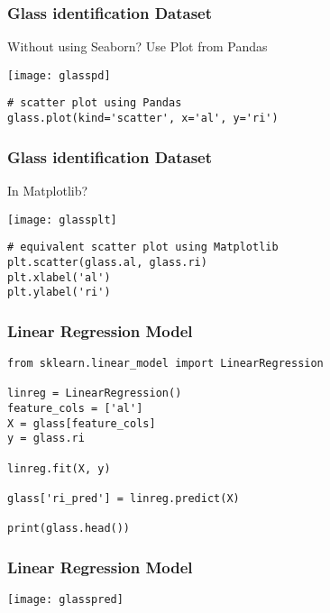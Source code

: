 \begin{frame}[fragile]\frametitle{Glass identification Dataset}
Without using Seaborn? Use Plot from Pandas

\begin{center}
\texttt{[image: glasspd]}
\end{center}

\begin{lstlisting}
# scatter plot using Pandas
glass.plot(kind='scatter', x='al', y='ri')
\end{lstlisting}

\end{frame}

\begin{frame}[fragile]\frametitle{Glass identification Dataset}
In Matplotlib?

\begin{center}
\texttt{[image: glassplt]}
\end{center}

\begin{lstlisting}
# equivalent scatter plot using Matplotlib
plt.scatter(glass.al, glass.ri)
plt.xlabel('al')
plt.ylabel('ri')
\end{lstlisting}

\end{frame}



\begin{frame}[fragile]\frametitle{Linear Regression Model}
\begin{lstlisting}
from sklearn.linear_model import LinearRegression

linreg = LinearRegression()
feature_cols = ['al']
X = glass[feature_cols]
y = glass.ri

linreg.fit(X, y)

glass['ri_pred'] = linreg.predict(X)

print(glass.head())
\end{lstlisting}
\end{frame}

\begin{frame}[fragile]\frametitle{Linear Regression Model}
\begin{center}
\texttt{[image: glasspred]}
\end{center}
\end{frame}

